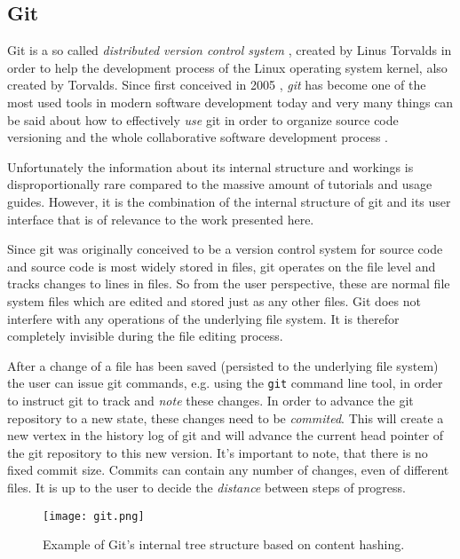 \subsection{Git}
\label{git}

Git is a so called \textit{distributed version control system}
\cite{git}, \cite{gitwiki} created by Linus Torvalds
\cite{gittalk} in order to help the development process of the
Linux operating system kernel, also created by Torvalds.
Since first conceived in 2005 \cite{gitbirth}, \textit{git} has become
one of the most used tools in modern software development today and
very many things can be said about how to effectively \textit{use}
git in order to organize source code versioning
and the whole collaborative software development process \cite{gitbook}.

Unfortunately the information about its internal structure and workings
is disproportionally rare compared to the massive amount of tutorials
and usage guides. However, it is the combination of the internal
structure of git and its user interface that is of relevance to the
work presented here.
\newline

Since git was originally conceived to be a version control system
for source code and source code is most widely stored in files,
git operates on the file level and tracks changes to lines in files.
So from the user perspective, these are normal file system files
which are edited and stored just as any other files. Git does not
interfere with any operations of the underlying file system.
It is therefor completely invisible during the file editing
process.

After a change of a file has been saved (persisted to the underlying
file system) the user can issue git commands, e.g. using the
\texttt{git} command line tool, in order to instruct git to track and
\textit{note} these changes. In order to advance the git repository
to a new state, these changes need to be \textit{commited}. This
will create a new vertex in the history log of git and will advance
the current head pointer of the git repository to this new
version. It's important to note, that there is no fixed commit size.
Commits can contain any number of changes, even of different files.
It is up to the user to decide the \textit{distance} between
steps of progress.

\begin{wrapfigure}{r}{0.5\textwidth}

  \texttt{[image: git.png]}
  \caption{Example of Git's internal tree structure based on content hashing.}
  \label{gittree}

\end{wrapfigure}

